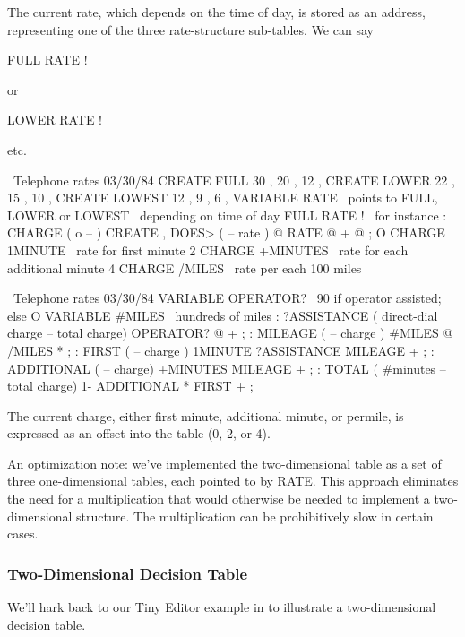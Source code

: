 The current rate, which depends on the time of day, is stored as an
address, representing one of the three rate-structure sub-tables. We can
say
\begin{Code}
FULL RATE !
\end{Code}
or
\begin{Code}
LOWER RATE !
\end{Code}
etc.

\begin{figure*}[tttt]
\begin{Screen}
\ Telephone rates                                   03/30/84
CREATE FULL     30 , 20 , 12 ,
CREATE LOWER    22 , 15 , 10 ,
CREATE LOWEST   12 ,  9 ,  6 ,
VARIABLE RATE   \ points to FULL, LOWER or LOWEST
                \ depending on time of day
FULL RATE !  \ for instance
: CHARGE   ( o -- ) CREATE ,
   DOES>  ( -- rate )  @  RATE @ +  @ ;
O CHARGE 1MINUTE   \ rate for first minute
2 CHARGE +MINUTES  \ rate for each additional minute
4 CHARGE /MILES    \ rate per each 100 miles
\end{Screen}

\begin{Screen}
\ Telephone rates                                   03/30/84
VARIABLE OPERATOR?  \ 90 if operator assisted; else O
VARIABLE #MILES  \ hundreds of miles
: ?ASSISTANCE  ( direct-dial charge -- total charge)
   OPERATOR? @  + ;
: MILEAGE  ( -- charge )  #MILES @  /MILES * ;
: FIRST  ( -- charge )  1MINUTE  ?ASSISTANCE  MILEAGE + ;
: ADDITIONAL  ( -- charge)  +MINUTES  MILEAGE + ;
: TOTAL ( #minutes -- total charge)
   1- ADDITIONAL *  FIRST + ;
\end{Screen}
\end{figure*}
The current charge, either first minute, additional minute, or permile,
is expressed as an offset into the table (0, 2, or 4).

An optimization note: we've implemented the two-dimensional table
as a set of three one-dimensional tables, each pointed to by RATE. This
approach eliminates the need for a multiplication that would otherwise be
needed to implement a two-dimensional structure. The multiplication can
be prohibitively slow in certain cases.

\subsubsection{Two-Dimensional Decision Table}

We'll hark back to our Tiny Editor example in  to illustrate
a two-dimensional decision table.

